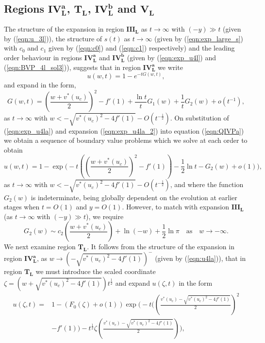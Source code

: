 \documentclass[11pt,a4paper]{article}
\newcommand{\eeref}[1]{(\ref{eqn:#1})}
\newcommand{\eelab}[1]{\label{eqn:#1}}
\def\beq{\begin{equation}}
\def\eeq{\end{equation}}
\begin{document}
\subsection{Regions $\mathbf{IV_L^a}$,
$\mathbf{T_L}$, 
 $\mathbf{IV_L^b}$  and $\mathbf{V_L}$}\label{three_L}

The structure of the expansion in region $\mathbf{III_L}$ as $t\to\infty$ with $(-y)\gg t$ (given by \eeref{u_3l}), the structure of $s(t)$ as $t \to \infty$ (given by  \eeref{exp_large_s} with $c_0$ and $c_1$ given by \eeref{c0} and \eeref{c1} respectively) and the leading order behaviour in regions $\mathbf{IV_L^a}$ and $\mathbf{IV_L^b}$ (given by \eeref{exp_u4l} and \eeref{BVP_4l_sol3}), suggests that in region $\mathbf{IV_L^a}$ we write 
\beq \eelab{exp_u4la}
u(w,t) = 1 - e^{-t G(w,t)},
\eeq
and expand in the form,
\beq \eelab{exp_u4la_2}
G(w,t) = \left( \frac{w+v^*(u_c)}{2} \right)^2 - f'(1) + \frac{\ln t }{t}G_1(w) + \frac{1}{t} G_2(w) + o(t^{-1}),
\eeq
as $t \to \infty$ with $  w < - \sqrt{v^*(u_c)^2 -  4 f'(1)} - O(t^{-\frac{1}{2}})$. On substitution of \eeref{exp_u4la} and expansion \eeref{exp_u4la_2} into equation \eeref{QIVPa} we obtain a sequence of boundary value problems which we solve at each order   to obtain
\beq \eelab{u4la}
u(w,t) =  1- \exp \Bigg( - t \left( \left( \frac{w+v^*(u_c)}{2} \right)^2 -f'(1) \right) - \frac{1}{2}  \ln t  -  G_2(w)+o(1) \Bigg), 
\eeq
as $t \to \infty$ with $  w < - \sqrt{v^*(u_c)^2 -  4 f'(1)} - O(t^{-\frac{1}{2}})$, and where the function $G_2(w)$ is indeterminate, being globally dependent on the evolution at earlier stages when $t=O(1)$ and $y=O(1)$. However, to match with expansion $\mathbf{III_L}$ (as $t\to\infty$ with $(-y)\gg t$), we require
\beq \eelab{match_con_4la}
G_2(w) \sim c_2 \left( \frac{w + v^*(u_c) }{2} \right) + \ln (-w)+ \frac{1}{2} \ln \pi \quad \mbox{as} \quad w \to - \infty.
\eeq
We next examine region $\mathbf{T_L}$. It follows from the structure of the expansion in region $\mathbf{IV_L^a}$, as $w \to (-  \sqrt{v^*(u_c)^2 -  4 f'(1)})^-$ (given by \eeref{u4la}), that in region $\mathbf{T_L}$ we must introduce the scaled coordinate $\zeta=\left(w+\sqrt{v^*(u_c)^2 - 4f'(1)}\right)t^{\frac{1}{2}}$ %
and expand $u(\zeta,t)$ in the form
  \begin{align} \eelab{exp_TL}
u(\zeta,t) =  & 1 - \left( F_0(\zeta) + o(1) \right) \exp \Bigg( -t \Bigg( \left( \frac{ v^*(u_c) - \sqrt{v^*(u_c)^2 - 4f'(1)}}{2} \right)^2  \nonumber  \\ 
&  -f'(1) \Bigg)   - t^{\frac{1}{2}} \zeta \left( \frac{v^*(u_c) - \sqrt{v^*(u_c)^2 - 4f'(1)}}{2} \right)  \Bigg)  ,
\end{align} 
\end{document}
